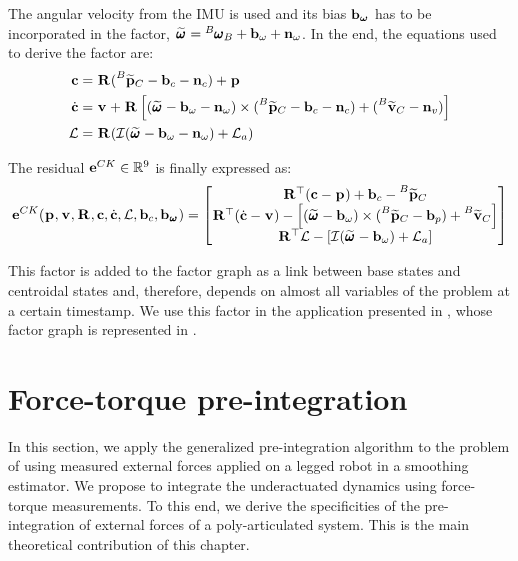 The angular velocity from the IMU is used and its bias ${\bf b}_{{\bm \omega}}$ has to be incorporated in the factor, $\prescript{}{}{\widetilde{\pmb{\omega}}}_{} = \prescript{B}{}{\pmb{\omega}}_{B} + {\bf b}_{\omega} + {\bf n}_{\omega}$.  
In the end, the equations used to derive the factor are:
%
\begin{equation}
    \begin{split}
    {\bf c} &= \prescript{}{}{{\bf R}}_{} (\prescript{B}{}{\widetilde{{\bf p}}}_{C} -  {\bf b}_{c} - {\bf n}_{c}) + \prescript{}{}{{\bf p}}_{}
    \\
    \dot{{\bf c}} &= 
    \prescript{}{}{{\bf v}}_{} + \prescript{}{}{{\bf R}}_{} \left[ (\prescript{}{}{\widetilde{\pmb{\omega}}}_{} - {\bf b}_{\omega} - {\bf n}_{\omega}) \times (\prescript{B}{}{\widetilde{{\bf p}}}_{C} -  {\bf b}_c - {\bf n}_c) + (\prescript{B}{}{\widetilde{{\bf v}}}_{C} - {\bf n}_{v}) \right]
    \\
    \mathcal{L} &= \prescript{}{}{{\bf R}}_{}(\mathcal{I} (\prescript{}{}{\widetilde{\pmb{\omega}}}_{} - {\bf b}_{\omega} - {\bf n}_{\omega}) + \mathcal{L}_a)
    \end{split}
\end{equation}

The residual ${\bf e}^{CK} \in \mathbb{R}^9$ is finally expressed as:
%
\begin{equation}
    {\bf e}^{CK}(\prescript{}{}{{\bf p}}_{}, \prescript{}{}{{\bf v}}_{}, \prescript{}{}{{\bf R}}_{}, {\bf c}, \dot{{\bf c}}, \mathcal{L}, {\bf b}_c, {\bf b}_{\prescript{}{}{\pmb{\omega}}_{}})=
    \begin{bmatrix}
        \prescript{}{}{{\bf R}}_{}^{\top}({\bf c} - \prescript{}{}{{\bf p}}_{}) + {\bf b}_{c} - \prescript{B}{}{\widetilde{{\bf p}}}_{C}
        \\
        \prescript{}{}{{\bf R}}_{}^{\top}(\dot{{\bf c}} - \prescript{}{}{{\bf v}}_{}) - \left[(\prescript{}{}{\widetilde{\pmb{\omega}}}_{} - {\bf b}_{\omega}) \times (\prescript{B}{}{\widetilde{{\bf p}}}_{C} -  {\bf b}_{p}) + \prescript{B}{}{\widetilde{{\bf v}}}_{C} \right]
        \\
        \prescript{}{}{{\bf R}}_{}^{\top}\mathcal{L} - \left[\mathcal{I} (\prescript{}{}{\widetilde{\pmb{\omega}}}_{} - {\bf b}_{\omega}) + \mathcal{L}_a \right]
    \end{bmatrix}
    \label{eq:CK_residual}
\end{equation}

This factor is added to the factor graph as a link between base states and centroidal states and, therefore, depends on almost all variables of the problem
at a certain timestamp. We use this factor in the application presented in , whose factor graph is represented in 
.



\section{Force-torque pre-integration}
\label{sec:force_torque_preint}
In this section, we apply the generalized pre-integration algorithm to the problem of using measured external
forces applied on a legged robot in a smoothing estimator. We propose to integrate the underactuated dynamics  using force-torque measurements.
To this end, we derive the specificities of the pre-integration of external forces of a poly-articulated system. This is the main theoretical contribution
of this chapter.

